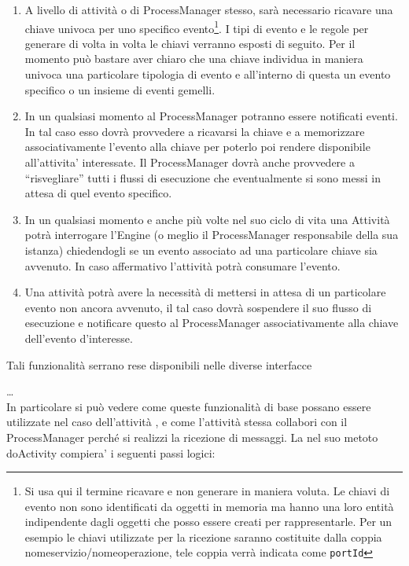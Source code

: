 \begin{enumerate}
  \item A livello di attività o di ProcessManager stesso,
  sarà necessario ricavare una chiave univoca per uno specifico 
  evento\footnote{Si usa qui il termine ricavare e non generare in maniera
  voluta. Le chiavi di evento non sono identificati da oggetti in memoria ma hanno una loro 
  entità indipendente
  dagli oggetti che posso essere creati per rappresentarle. Per un esempio le
  chiavi utilizzate per la ricezione saranno costituite dalla coppia
  nomeservizio/nomeoperazione, tele coppia verrà indicata come
  \texttt{portId} }. I tipi di evento e le regole per generare di volta in volta 
  le chiavi verranno esposti di seguito. Per il momento può bastare aver
  chiaro che una chiave individua in maniera univoca una particolare tipologia di evento e all'interno di questa un evento specifico o un insieme
  di eventi gemelli. 
  
  \item In un qualsiasi momento al ProcessManager potranno essere notificati
  eventi. In tal caso esso dovrà provvedere a ricavarsi la chiave e a
  memorizzare associativamente l'evento alla chiave per poterlo poi rendere
  disponibile all'attivita' interessate. Il ProcessManager dovrà anche
  provvedere a ``risvegliare'' tutti i flussi di esecuzione che
  eventualmente si sono messi in attesa di quel evento specifico.
   
  \item In un qualsiasi momento e anche più volte nel suo ciclo di vita una
  Attività potrà interrogare l'Engine (o meglio il ProcessManager responsabile
  della sua istanza) chiedendogli se un evento associato ad una particolare
  chiave sia avvenuto. In caso affermativo l'attività potrà consumare l'evento.

  \item Una attività potrà avere la necessità di mettersi in attesa di un
  particolare evento non ancora avvenuto, il tal caso dovrà sospendere il
  suo flusso di esecuzione e notificare questo al ProcessManager
  associativamente alla chiave dell'evento d'interesse. 
\end{enumerate}

Tali funzionalità serrano rese disponibili nelle diverse interfacce 


\ldots
\\

In particolare si può vedere come queste funzionalità di base possano essere
utilizzate nel caso dell'attività , e come
l'attività stessa collabori con il ProcessManager perché si realizzi la
ricezione di messaggi. La  nel suo metoto doActivity
compiera' i seguenti passi logici:

